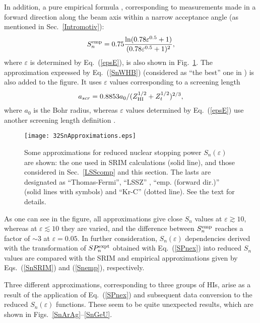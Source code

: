 \documentclass[aps,pra,twocolumn,amsmath,amssymb,floatfix]{revtex4-2}
\begin{document}
In addition, a pure empirical formula \cite{Garnir80}, corresponding to measurements made in a forward direction along the beam axis within a narrow acceptance angle (as mentioned in Sec.~\ref{Intromotiv}):
\begin{equation}\label{Snemp}
  S_{n}^{\rm emp} = 0.75 \frac{\ln(0.78 \varepsilon^{0.5} + 1)}{(0.78 \varepsilon^{0.5} + 1)^{2}},
\end{equation}
where $\varepsilon$ is determined by Eq.~(\ref{epsE}), is also shown in Fig.~\ref{Snapprox}. The approximation expressed by Eq.~(\ref{SnWHB}) (considered as ``the best'' one in \cite{Wilson77}) is also added to the figure. It uses $\varepsilon$ values corresponding to  a screening length
\begin{equation}\label{aKrC}
  a_{scr} = 0.8853 a_{0} / (Z_{\rm HI}^{1/2}+Z_{t}^{1/2})^{2/3},
\end{equation}
where $a_{0}$ is the Bohr radius, whereas $\varepsilon$ values determined by Eq.~(\ref{epsE}) use another screening length definition \cite{Sigmund04}.

\begin{figure}[!h]  %
\begin{center}
\texttt{[image: 32SnApproximations.eps]}
\caption{\label{Snapprox} Some approximations for reduced nuclear stopping power $S_{n}(\varepsilon)$ are shown: the one used in SRIM calculations (solid line), and those considered in Sec.~\ref{LSScomp} and this section. The lasts are designated as ``Thomas-Fermi'', ``LSSZ'' \cite{Ziegler77}, ``emp. (forward dir.)'' \cite{Garnir80} (solid lines with symbols) and ``Kr-C'' \cite{Wilson77} (dotted line). See the text for details.}
\end{center}
\end{figure}

As one can see in the figure, all approximations give close $S_{n}$ values at $\varepsilon \gtrsim 10$, whereas at $\varepsilon \lesssim 10$ they are varied, and the difference between $S_{n}^{\rm emp}$ reaches a factor of $\sim$3 at $\varepsilon = 0.05$. In further consideration, $S_{n}(\varepsilon)$ dependencies derived with the transformation of $SP_{n}^{\rm expt}$ obtained with Eq.~(\ref{SPnex}) into reduced $S_{n}$ values are compared with the SRIM and empirical approximations given by Eqs.~(\ref{SnSRIM}) and (\ref{Snemp}), respectively.

Three different approximations, corresponding to three groups of HIs, arise as a result of the application of Eq.~(\ref{SPnex}) and subsequent data conversion to the reduced $S_{n}(\varepsilon)$ functions. These seem to be quite unexpected results, which are shown in Figs.~\ref{SnArAg}--\ref{SnGeU}.
\end{document}
